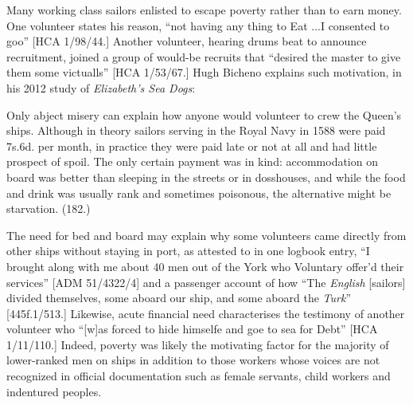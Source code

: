    Many working class sailors enlisted to escape poverty rather than to earn money. One volunteer states his reason, “not having any thing to Eat ...I consented to goo” [HCA 1/98/44.] Another volunteer, hearing drums beat to announce recruitment, joined a group of would-be recruits that “desired the master to give them some victualls” [HCA 1/53/67.] Hugh Bicheno explains such motivation, in his 2012 study of \textit{Elizabeth’s Sea Dogs}:

Only abject misery can explain how anyone would volunteer to crew the Queen’s ships. Although in theory sailors serving in the Royal Navy in 1588 were paid 7s.6d. per month, in practice they were paid late or not at all and had little prospect of spoil. The only certain payment was in kind: accommodation on board was better than sleeping in the streets or in dosshouses, and while the food and drink was usually rank and sometimes poisonous, the alternative might be starvation. (182.)

The need for bed and board may explain why some volunteers came directly from other ships without staying in port, as attested to in one logbook entry, “I brought along with me about 40 men out of the York who Voluntary offer’d their services” [ADM 51/4322/4] and a passenger account of how “The \textit{English} [sailors] divided themselves, some aboard our ship, and some aboard the \textit{Turk}” [445f.1/513.] Likewise, acute financial need characterises the testimony of another volunteer who “[w]as forced to hide himselfe and goe to sea for Debt” [HCA 1/11/110.] Indeed, poverty was likely the motivating factor for the majority of lower-ranked men on ships in addition to those workers whose voices are not recognized in official documentation such as female servants, child workers and indentured peoples.

